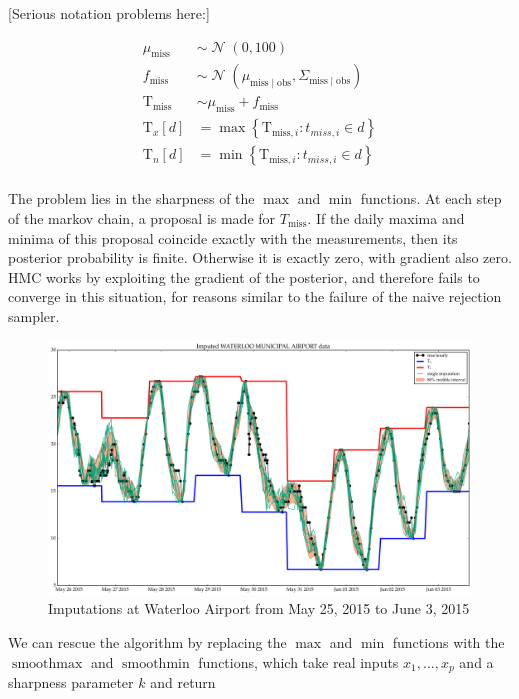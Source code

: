 \documentclass[letter]{article}
\makeatletter
\def\maxwidth{\ifdim\Gin@nat@width>\linewidth\linewidth
\else\Gin@nat@width\fi}
\let\Oldincludegraphics\includegraphics
\renewcommand{\includegraphics}[1]{\Oldincludegraphics[width=.8\maxwidth]{#1}}
\newcommand{\genericdel}[3]{%
      \left#1#3\right#2
    }
\newcommand{\del}[1]{\genericdel(){#1}}
\newcommand{\sbr}[1]{\genericdel[]{#1}}
\newcommand{\cbr}[1]{\genericdel\{\}{#1}}
\DeclareMathOperator{\normal}{\mathcal{N}}
\newcommand{\T}{\mathrm{T}}
\newcommand{\Tn}{\T_{n}}
\newcommand{\Tx}{\T_{x}}
\newcommand{\miss}{\mathrm{miss}}
\newcommand{\obs}{\mathrm{obs}}
\DeclareMathOperator{\softmax}{smoothmax}
\DeclareMathOperator{\softmin}{smoothmin}
\makeatother
\begin{document}
{[}Serious notation problems here:{]}

\begin{align}
    \mu_\miss &\sim \normal\del{0,100} \\
    f_\miss &\sim \normal\del{\mu_{\miss \mid \obs}, \Sigma_{\miss \mid \obs}} \\
    \T_\miss &\sim \mu_\miss + f_\miss \\
    \Tx\sbr{d} &= \max\cbr{ \T_{\miss,i}: t_{miss,i} \in d } \\
    \Tn\sbr{d} &= \min\cbr{ \T_{\miss,i}: t_{miss,i} \in d } \\
\end{align}
    


    	The problem lies in the sharpness of the \(\max\) and \(\min\)
functions. At each step of the markov chain, a proposal is made for
\(T_\miss\). If the daily maxima and minima of this proposal coincide
exactly with the measurements, then its posterior probability is finite.
Otherwise it is exactly zero, with gradient also zero. HMC works by
exploiting the gradient of the posterior, and therefore fails to
converge in this situation, for reasons similar to the failure of the
naive rejection sampler.

\begin{figure}
\centering
\includegraphics{figures/imputations_SEonly.png}
\caption{Imputations at Waterloo Airport from May 25, 2015 to June 3,
2015}
\end{figure}

We can rescue the algorithm by replacing the \(\max\) and \(\min\)
functions with the \(\softmax\) and \(\softmin\) functions, which take
real inputs \(x_1, \ldots, x_p\) and a sharpness parameter \(k\) and
return
\end{document}
